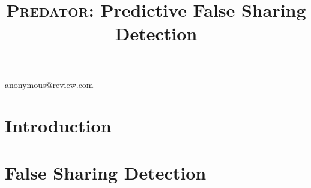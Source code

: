 \documentclass[9pt]{sigplanconf}
\date{} %
\newcommand{\Predator}{{\scshape Predator}}
\begin{document}


\title{\Predator{}: Predictive False Sharing Detection}
           {anonymous@review.com}

\maketitle

\begin{abstract}

\end{abstract}

\begin{comment}
\category{CR-number}{subcategory}{third-level}

\terms
term1, term2

\keywords
keyword1, keyword2
\end{comment}

\section{Introduction}



\section{False Sharing Detection}

\end{document}
